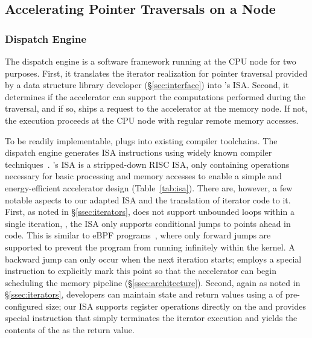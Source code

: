 \subsection{Accelerating Pointer Traversals on a Node}
\label{sec:accelerator}


\subsubsection{\name Dispatch Engine}\label{ssec:compute_node}
The dispatch engine is a software framework running at the CPU node for two purposes.  First, it translates the iterator realization for pointer traversal provided by a data structure library developer (\S\ref{sec:interface}) into \name's ISA. Second, it determines if the accelerator can support the computations performed during the traversal, and if so, ships a request to the accelerator at the memory node. If not, the execution proceeds at the CPU node with regular remote memory accesses.

 To be readily implementable, \name plugs into existing compiler toolchains. The dispatch engine generates \name ISA instructions using widely known compiler techniques~\cite{llvm}. 
\name's ISA is a stripped-down RISC ISA, only containing operations necessary for basic processing and memory accesses to enable a simple and energy-efficient accelerator design (Table~\ref{tab:isa}). There are, however, a few notable aspects to our adapted ISA and the translation of iterator code to it. First, as noted in \S\ref{ssec:iterators}, \name does not support unbounded loops within a single iteration, \ie, the ISA only supports conditional jumps to points ahead in code. This is similar to eBPF programs~\cite{ebpfjump}, where only forward jumps are supported to prevent the program from running infinitely within the kernel. A backward jump can only occur when the next iteration starts; \name employs a special  instruction to explicitly mark this point so that the accelerator can begin scheduling the memory pipeline (\S\ref{ssec:architecture}). Second, again as noted in \S\ref{ssec:iterators}, developers can maintain state and return values using a  of pre-configured size; our ISA supports register operations directly on the  and provides special  instruction that simply terminates the iterator execution and yields the contents of the  as the return value. 

